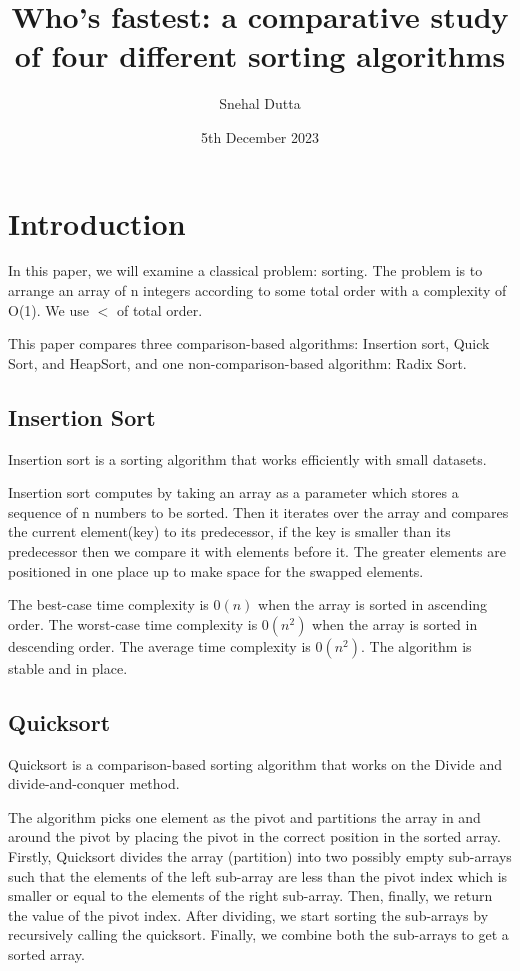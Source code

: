 \documentclass{article}
\title{Who's fastest: a comparative study of four different sorting algorithms}
\author{Snehal Dutta}
\date{5th December 2023}
\begin{document}
\maketitle

\section{Introduction}
In this paper, we will examine a classical problem: sorting. The problem is to arrange an array of n integers according to some total order with a complexity of O(1). We use $<$ of total order.

This paper compares three comparison-based algorithms: Insertion sort, Quick Sort, and HeapSort, and one non-comparison-based algorithm: Radix Sort.

\subsection{Insertion Sort}
Insertion sort is a sorting algorithm that works efficiently with small datasets.

Insertion sort computes by taking an array as a parameter which stores a sequence of n numbers to be sorted. Then it iterates over the array and compares the current element(key) to its predecessor, if the key is smaller than its predecessor then we compare it with elements before it. The greater elements are positioned in one place up to make space for the swapped elements.

The best-case time complexity is $0(n)$ when the array is sorted in ascending order.
The worst-case time complexity is $0(n^2)$ when the array is sorted in descending order.
The average time complexity is $0(n^2)$.
The algorithm is stable and in place.

\subsection{Quicksort}
Quicksort is a comparison-based sorting algorithm that works on the Divide and divide-and-conquer method. 

The algorithm picks one element as the pivot and partitions the array in and around the pivot by placing the pivot in the correct position in the sorted array. Firstly, Quicksort divides the array (partition) into two possibly empty sub-arrays such that the elements of the left sub-array are less than the pivot index which is smaller or equal to the elements of the right sub-array. Then, finally, we return the value of the pivot index. After dividing, we start sorting the sub-arrays by recursively calling the quicksort. Finally, we combine both the sub-arrays to get a sorted array.
\end{document}
